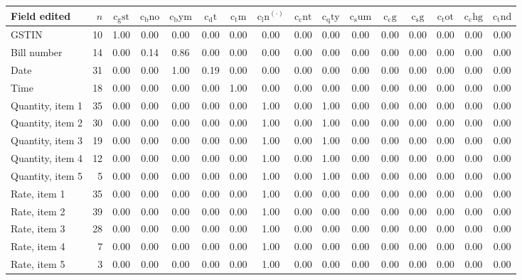\begin{tabular}{lrcccccccccccccc}
\toprule
Field edited & $n$ & $\mathrm{c_gst}$ & $\mathrm{c_bno}$ & $\mathrm{c_bym}$ & $\mathrm{c_dt}$ & $\mathrm{c_tm}$ & $\mathrm{c_ln}^{(\cdot)}$ & $\mathrm{c_cnt}$ & $\mathrm{c_qty}$ & $\mathrm{c_sum}$ & $\mathrm{c_cg}$ & $\mathrm{c_sg}$ & $\mathrm{c_tot}$ & $\mathrm{c_chg}$ & $\mathrm{c_tnd}$\\
\midrule
GSTIN & 10 & 1.00 & 0.00 & 0.00 & 0.00 & 0.00 & 0.00 & 0.00 & 0.00 & 0.00 & 0.00 & 0.00 & 0.00 & 0.00 & 0.00\\
Bill number & 14 & 0.00 & 0.14 & 0.86 & 0.00 & 0.00 & 0.00 & 0.00 & 0.00 & 0.00 & 0.00 & 0.00 & 0.00 & 0.00 & 0.00\\
Date & 31 & 0.00 & 0.00 & 1.00 & 0.19 & 0.00 & 0.00 & 0.00 & 0.00 & 0.00 & 0.00 & 0.00 & 0.00 & 0.00 & 0.00\\
Time & 18 & 0.00 & 0.00 & 0.00 & 0.00 & 1.00 & 0.00 & 0.00 & 0.00 & 0.00 & 0.00 & 0.00 & 0.00 & 0.00 & 0.00\\
Quantity, item 1 & 35 & 0.00 & 0.00 & 0.00 & 0.00 & 0.00 & 1.00 & 0.00 & 1.00 & 0.00 & 0.00 & 0.00 & 0.00 & 0.00 & 0.00\\
Quantity, item 2 & 30 & 0.00 & 0.00 & 0.00 & 0.00 & 0.00 & 1.00 & 0.00 & 1.00 & 0.00 & 0.00 & 0.00 & 0.00 & 0.00 & 0.00\\
Quantity, item 3 & 19 & 0.00 & 0.00 & 0.00 & 0.00 & 0.00 & 1.00 & 0.00 & 1.00 & 0.00 & 0.00 & 0.00 & 0.00 & 0.00 & 0.00\\
Quantity, item 4 & 12 & 0.00 & 0.00 & 0.00 & 0.00 & 0.00 & 1.00 & 0.00 & 1.00 & 0.00 & 0.00 & 0.00 & 0.00 & 0.00 & 0.00\\
Quantity, item 5 & 5 & 0.00 & 0.00 & 0.00 & 0.00 & 0.00 & 1.00 & 0.00 & 1.00 & 0.00 & 0.00 & 0.00 & 0.00 & 0.00 & 0.00\\
Rate, item 1 & 35 & 0.00 & 0.00 & 0.00 & 0.00 & 0.00 & 1.00 & 0.00 & 0.00 & 0.00 & 0.00 & 0.00 & 0.00 & 0.00 & 0.00\\
Rate, item 2 & 39 & 0.00 & 0.00 & 0.00 & 0.00 & 0.00 & 1.00 & 0.00 & 0.00 & 0.00 & 0.00 & 0.00 & 0.00 & 0.00 & 0.00\\
Rate, item 3 & 28 & 0.00 & 0.00 & 0.00 & 0.00 & 0.00 & 1.00 & 0.00 & 0.00 & 0.00 & 0.00 & 0.00 & 0.00 & 0.00 & 0.00\\
Rate, item 4 & 7 & 0.00 & 0.00 & 0.00 & 0.00 & 0.00 & 1.00 & 0.00 & 0.00 & 0.00 & 0.00 & 0.00 & 0.00 & 0.00 & 0.00\\
Rate, item 5 & 3 & 0.00 & 0.00 & 0.00 & 0.00 & 0.00 & 1.00 & 0.00 & 0.00 & 0.00 & 0.00 & 0.00 & 0.00 & 0.00 & 0.00\\

\end{tabular}
